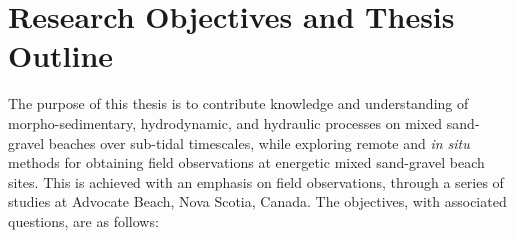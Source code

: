 



\section{Research Objectives and Thesis Outline}\label{section:Objectives}


The purpose of this thesis is to contribute knowledge and understanding of morpho-sedimentary, hydrodynamic, and hydraulic processes on mixed sand-gravel beaches over sub-tidal timescales, while exploring remote and \textit{in situ} methods for obtaining field observations at energetic mixed sand-gravel beach sites. This is achieved with an emphasis on field observations, through a series of studies at Advocate Beach, Nova Scotia, Canada. The objectives, with associated questions, are as follows:

